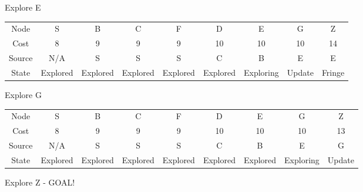 \documentclass{article}
\begin{document}
\begin{enumerate}
        
        Explore E
        \newline
        \begin{left}
            \begin{tabular}{c|c|c|c|c|c|c|c|c}
            \hline
                Node & S & B & C & F & D & E & G & Z\\
                Cost & 8 & 9 & 9 & 9 & 10 & 10 & 10 & 14\\
                Source & N/A & S & S & S & C & B & E & E\\
                State & Explored & Explored & Explored & Explored & Explored & Exploring & Update & Fringe\\
            \hline
            \end{tabular}
        \end{left}
        \newline
        \newline
        
        
        Explore G
        \newline
        \begin{left}
            \begin{tabular}{c|c|c|c|c|c|c|c|c}
            \hline
                Node & S & B & C & F & D & E & G & Z\\
                Cost & 8 & 9 & 9 & 9 & 10 & 10 & 10 & 13\\
                Source & N/A & S & S & S & C & B & E & G\\
                State & Explored & Explored & Explored & Explored & Explored & Explored & Exploring & Update\\
            \hline
            \end{tabular}
        \end{left}
        
        \newline
        \newline
        
        Explore Z - GOAL!
        
        
        
    \end{enumerate}



    \newpage
\end{document}
